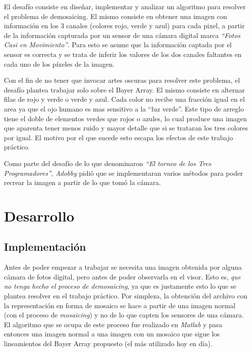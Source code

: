 \par 
El desafío consiste en diseñar, implementar y analizar un algoritmo para resolver el
problema de demosaicing. El mismo consiste en obtener una imagen con información en los 3 canales (colores rojo, verde y azul) para cada pixel, a partir de la información capturada por un sensor de una cámara digital marca \textit{``Fotos Casi en Movimiento''}. Para esto se asume que la información captada por el sensor es
correcta y se trata de inferir los valores de los dos canales faltantes en cada uno de los píxeles de la imagen.
\par 
Con el fin de no tener que invocar artes oscuras para resolver este problema, el desafío plantea trabajar solo sobre el Bayer Array. El mismo consiste en alternar filas de rojo y verde o verde y azul. Cada color no recibe una fracción igual en el area ya que el ojo humano es mas sensitivo a la ``luz verde''. Este tipo de arreglo tiene el doble de elementos verdes que rojos o azules, lo cual produce una imagen que aparenta tener menos ruido y mayor detalle que si se trataran los tres colores por igual. El motivo por el que sucede esto escapa los efectos de este trabajo práctico.
\par 
Como parte del desafío de lo que denominaron \textit{``El torneo de los Tres Programadores''}, \textit{Adobby} pidió que se implementaran varios métodos para poder recrear la imagen a partir de lo que tomó la cámara.


\section{Desarrollo}

\subsection{Implementación}

Antes de poder empezar a trabajar se necesita una imagen obtenida por alguna cámara de fotos digital, pero antes de poder observarla en el visor. Esto es, \textit{que no tenga hecho el proceso de demosaicing}, ya que es justamente esto lo que se plantea resolver en el trabajo práctico. Por simpleza, la obtención del archivo con la representación en forma de mosaico se hace a partir de una imagen normal (con el proceso de \textit{mosaicing}) y no de lo que capten los sensores de una cámara. El algoritmo que se ocupa de este proceso fue realizado en \textit{Matlab} y pasa entonces una imagen normal a una imagen con un mosaico que sigue los lineamientos del Bayer Array propuesto (el más utilizado hoy en día).

